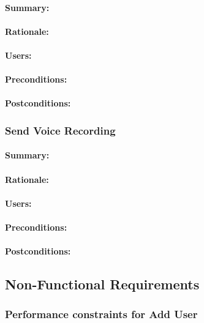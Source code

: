 \documentclass[11pt]{article}
\begin{document}
\paragraph{Summary:}
\paragraph{Rationale:}
\paragraph{Users:}
\paragraph{Preconditions:}
\paragraph{{Postconditions:}}
\subsubsection{Send Voice Recording} \label{UC-send-voice}
\paragraph{Summary:}
\paragraph{Rationale:}
\paragraph{Users:}
\paragraph{Preconditions:}
\paragraph{{Postconditions:}}

\subsection{Non-Functional Requirements}
\subsubsection{Performance constraints for Add User} \label{NF-performance-add-user}
\end{document}
